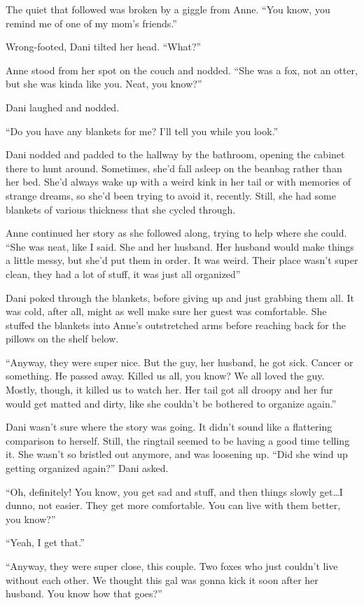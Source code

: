 The quiet that followed was broken by a giggle from Anne. ``You know, you remind me of one of my mom's friends.''

Wrong-footed, Dani tilted her head. ``What?''

Anne stood from her spot on the couch and nodded. ``She was a fox, not an otter, but she was kinda like you. Neat, you know?''

Dani laughed and nodded.

``Do you have any blankets for me? I'll tell you while you look.''

Dani nodded and padded to the hallway by the bathroom, opening the cabinet there to hunt around. Sometimes, she'd fall asleep on the beanbag rather than her bed. She'd always wake up with a weird kink in her tail or with memories of strange dreams, so she'd been trying to avoid it, recently. Still, she had some blankets of various thickness that she cycled through.

Anne continued her story as she followed along, trying to help where she could. ``She was neat, like I said. She and her husband. Her husband would make things a little messy, but she'd put them in order. It was weird. Their place wasn't super clean, they had a lot of stuff, it was just all organized''

Dani poked through the blankets, before giving up and just grabbing them all. It was cold, after all, might as well make sure her guest was comfortable. She stuffed the blankets into Anne's outstretched arms before reaching back for the pillows on the shelf below.

``Anyway, they were super nice. But the guy, her husband, he got sick. Cancer or something. He passed away. Killed us all, you know? We all loved the guy. Mostly, though, it killed us to watch her. Her tail got all droopy and her fur would get matted and dirty, like she couldn't be bothered to organize again.''

Dani wasn't sure where the story was going. It didn't sound like a flattering comparison to herself. Still, the ringtail seemed to be having a good time telling it. She wasn't so bristled out anymore, and was loosening up. ``Did she wind up getting organized again?'' Dani asked.

``Oh, definitely! You know, you get sad and stuff, and then things slowly get\ldots{}I dunno, not easier. They get more comfortable. You can live with them better, you know?''

``Yeah, I get that.''

``Anyway, they were super close, this couple. Two foxes who just couldn't live without each other. We thought this gal was gonna kick it soon after her husband. You know how that goes?''

